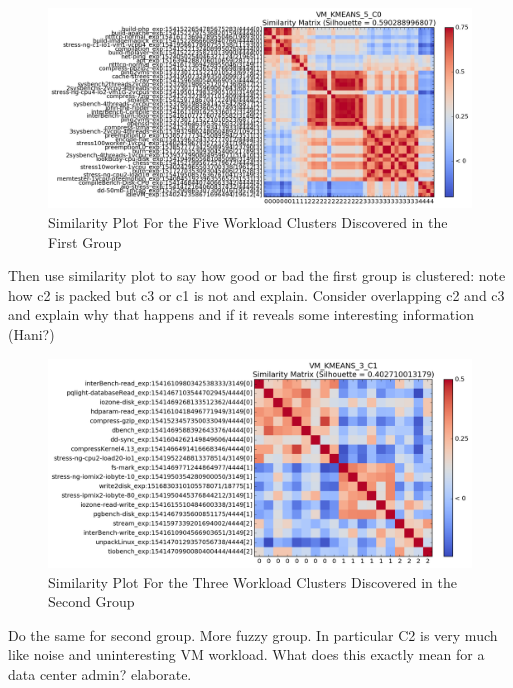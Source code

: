 \documentclass[10pt, conference, compsocconf]{IEEEtran}
\begin{document}
\begin{figure}[!htpb]
\centering
\includegraphics[width=\textwidth]{figs/VM_KMEANS_5_C0.png}
\caption{Similarity Plot For the Five Workload Clusters Discovered in the First Group}
\label{fig:c0-sim}
\end{figure}
Then use similarity plot to say how good or bad the first group is clustered: note how c2 is packed but c3 or c1 is not and explain. Consider overlapping c2 and c3 and explain why that happens and if it reveals some interesting information (Hani?)

\begin{figure}[!htpb]
\centering
\includegraphics[width=\textwidth]{figs/VM_KMEANS_3_C1.png}
\caption{Similarity Plot For the Three Workload Clusters Discovered in the Second Group}
\label{fig:c1-sim}
\end{figure}
Do the same for second group. More fuzzy group. In particular C2 is very much like noise and uninteresting VM workload. What does this exactly mean for a data center admin? elaborate. 
\end{document}
